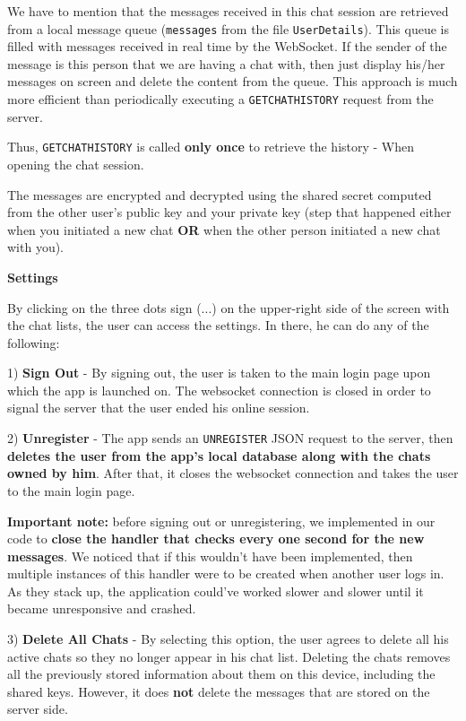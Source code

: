 We have to mention that the messages received in this chat session are retrieved from a local message queue (\verb|messages| from the file \verb|UserDetails|). This queue is filled with messages received in real time by the WebSocket. If the sender of the message is this person that we are having a chat with, then just display his/her messages on screen and delete the content from the queue. This approach is much more efficient than periodically executing a \verb|GETCHATHISTORY| request from the server.

Thus, \verb|GETCHATHISTORY| is called \textbf{only once} to retrieve the history - When opening the chat session.

The messages are encrypted and decrypted using the shared secret computed from the other user's public key and your private key (step that happened either when you initiated a new chat \textbf{OR} when the other person initiated a new chat with you).

\textbf{Settings}

By clicking on the three dots sign (...) on the upper-right side of the screen with the chat lists, the user can access the settings. In there, he can do any of the following:

1) \textbf{Sign Out} - By signing out, the user is taken to the main login page upon which the app is launched on. The websocket connection is closed in order to signal the server that the user ended his online session.

2) \textbf{Unregister} - The app sends an \verb|UNREGISTER| JSON request to the server, then \textbf{deletes the user from the app's local database along with the chats owned by him}. After that, it closes the websocket connection and takes the user to the main login page.

\textbf{Important note:} before signing out or unregistering, we implemented in our code to \textbf{close the handler that checks every one second for the new messages}. We noticed that if this wouldn't have been implemented, then multiple instances of this handler were to be created when another user logs in. As they stack up, the application could've worked slower and slower until it became unresponsive and crashed.

3) \textbf{Delete All Chats} - By selecting this option, the user agrees to delete all his active chats so they no longer appear in his chat list. Deleting the chats removes all the previously stored information about them on this device, including the shared keys. However, it does \textbf{not} delete the messages that are stored on the server side.

